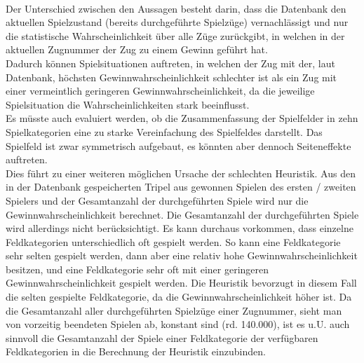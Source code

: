 \\Der Unterschied zwischen den Aussagen besteht darin, dass die Datenbank den aktuellen Spielzustand (bereits durchgeführte Spielzüge) vernachlässigt und nur die statistische Wahrscheinlichkeit über alle Züge zurückgibt, in welchen in der aktuellen Zugnummer der Zug zu einem Gewinn geführt hat.
\\Dadurch können Spielsituationen auftreten, in welchen der Zug mit der, laut Datenbank, höchsten Gewinnwahrscheinlichkeit schlechter ist als ein Zug mit einer vermeintlich geringeren Gewinnwahrscheinlichkeit, da die jeweilige Spielsituation die Wahrscheinlichkeiten stark beeinflusst.
\vspace{0.5cm}
\\Es müsste auch evaluiert werden, ob die Zusammenfassung der Spielfelder in zehn Spielkategorien eine zu starke Vereinfachung des Spielfeldes darstellt. Das Spielfeld ist zwar symmetrisch aufgebaut, es könnten aber dennoch Seiteneffekte auftreten.
\vspace{0.5cm}
\\Dies führt zu einer weiteren möglichen Ursache der schlechten Heuristik. Aus den in der Datenbank gespeicherten Tripel aus gewonnen Spielen des ersten / zweiten Spielers und der Gesamtanzahl der durchgeführten Spiele wird nur die Gewinnwahrscheinlichkeit berechnet. Die Gesamtanzahl der durchgeführten Spiele wird allerdings nicht berücksichtigt. Es kann durchaus vorkommen, dass einzelne Feldkategorien unterschiedlich oft gespielt werden. So kann eine Feldkategorie sehr selten gespielt werden, dann aber eine relativ hohe Gewinnwahrscheinlichkeit besitzen, und eine Feldkategorie sehr oft mit einer geringeren Gewinnwahrscheinlichkeit gespielt werden. Die Heuristik bevorzugt in diesem Fall die selten gespielte Feldkategorie, da die Gewinnwahrscheinlichkeit höher ist. Da die Gesamtanzahl aller durchgeführten Spielzüge einer Zugnummer, sieht man von vorzeitig beendeten Spielen ab, konstant sind (rd. 140.000), ist es u.U. auch sinnvoll die Gesamtanzahl der Spiele einer Feldkategorie der verfügbaren Feldkategorien in die Berechnung der Heuristik einzubinden.

